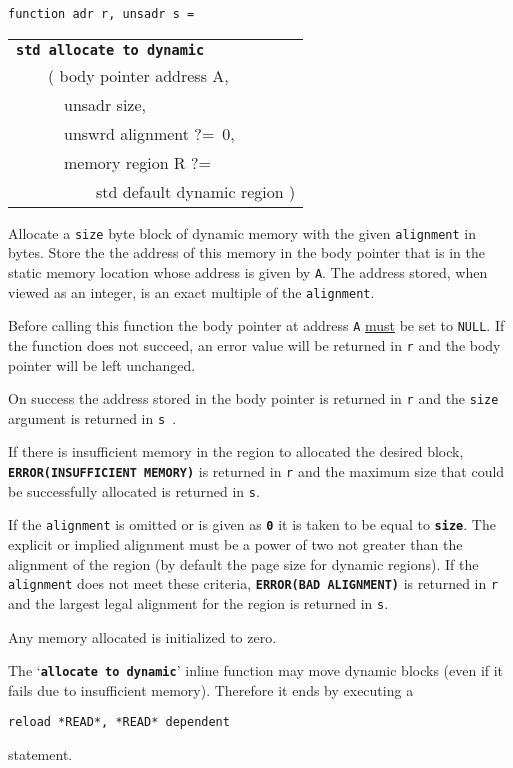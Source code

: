\documentclass[12pt]{article}
\makeatletter
\newcommand{\TT}[1]{{\tt \bfseries #1}}
\newcommand{\ttstdlkey}[2]{\TT{std #1 #2}\index{#1@{\tt std #1}!#2@{\tt #2}}}
\newcommand{\EOL}{\penalty \exhyphenpenalty}
\newenvironment{indpar}[1][0.3in]%
	{\begin{list}{}%
		     {\setlength{\itemsep}{0in}%
		      \setlength{\topsep}{0in}%
		      \setlength{\parsep}{1ex}%
		      \setlength{\labelwidth}{#1}%
		      \setlength{\leftmargin}{#1}%
		      \addtolength{\leftmargin}{\labelsep}}%
	 \item}%
	{\end{list}}
\makeatother
\begin{document}
\begin{indpar}

{\tt function adr r, unsadr s = \\
\hspace*{1in}\begin{tabular}[t]{@{}l@{}}
	     \ttstdlkey{allocate}{to dynamic} \\
	     ~~~~( body pointer address A, \\
	     ~~~~~~unsadr size, \\
	     ~~~~~~unswrd alignment ?=~0, \\
	     ~~~~~~memory region R ?= \\
	     ~~~~~~~~~~std default dynamic region ) \\
	     \end{tabular}}

\begin{indpar}
Allocate a {\tt size} byte block of dynamic memory with the given
{\tt alignment} in bytes.  Store the
the address of this memory in the body pointer that is in the static
memory location whose address is given by {\tt A}.
The address stored, when viewed as an
integer, is an exact multiple of the {\tt alignment}.

Before calling this function the body pointer at address {\tt A}
\underline{must} be set to {\tt NULL}.  If the function does not succeed,
an error value will be returned in {\tt r} and the body pointer will be
left unchanged.

On success the address stored in the body pointer is returned in {\tt r} and
the {\tt size} argument is returned in {\tt s }.

If there is insufficient memory in the region to allocated the desired block,
\TT{ERROR(\EOL INSUFFICIENT MEMORY)} is returned in {\tt r} and
the maximum size that could be successfully allocated is returned in {\tt s}.

If the {\tt alignment} is omitted or is given as \TT{0} it is taken
to be equal to \TT{size}.  The explicit or implied
alignment must be a power of two not greater than the alignment of the
region (by default the page size for dynamic regions).  If the {\tt alignment}
does not meet these criteria,
\TT{ERROR(BAD ALIGNMENT)} is returned in {\tt r}
and the largest legal alignment for the region is returned in {\tt s}.

Any memory allocated is initialized to zero.

The `\TT{allocate to dynamic}' inline function may move dynamic blocks
(even if it fails due to insufficient memory).
Therefore it ends by executing a
\begin{center}
{\tt reload *READ*, *READ* dependent}
\end{center}
statement.


\end{indpar}
\end{indpar}
\end{document}
